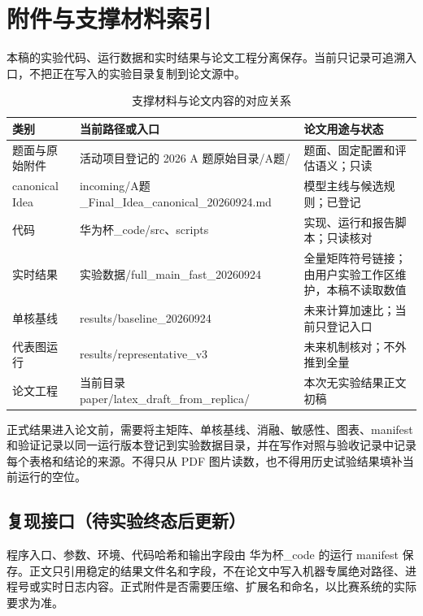\clearpage
\section*{附件与支撑材料索引}
本稿的实验代码、运行数据和实时结果与论文工程分离保存。当前只记录可追溯入口，不把正在写入的实验目录复制到论文源中。
\begin{table}[H]\centering\caption{支撑材料与论文内容的对应关系}
\begin{tabularx}{\linewidth}{lYY}\toprule
类别 & 当前路径或入口 & 论文用途与状态\\\midrule
题面与原始附件 & \textnormal{活动项目登记的 2026 A 题原始目录/A题/} & 题面、固定配置和评估语义；只读\\
canonical Idea & \textnormal{incoming/A题\_Final\_Idea\_canonical\_20260924.md} & 模型主线与候选规则；已登记\\
代码 & \textnormal{华为杯\_code/src、scripts} & 实现、运行和报告脚本；只读核对\\
实时结果 & \textnormal{实验数据/full\_main\_fast\_20260924} & 全量矩阵符号链接；由用户实验工作区维护，本稿不读取数值\\
单核基线 & \textnormal{results/baseline\_20260924} & 未来计算加速比；当前只登记入口\\
代表图运行 & \textnormal{results/representative\_v3} & 未来机制核对；不外推到全量\\
论文工程 & 当前目录 \textnormal{paper/latex\_draft\_from\_replica/} & 本次无实验结果正文初稿\\\bottomrule
\end{tabularx}\end{table}

正式结果进入论文前，需要将主矩阵、单核基线、消融、敏感性、图表、manifest 和验证记录以同一运行版本登记到实验数据目录，并在写作对照与验收记录中记录每个表格和结论的来源。不得只从 PDF 图片读数，也不得用历史试验结果填补当前运行的空位。

\subsection*{复现接口（待实验终态后更新）}
程序入口、参数、环境、代码哈希和输出字段由 \textnormal{华为杯\_code} 的运行 manifest 保存。正文只引用稳定的结果文件名和字段，不在论文中写入机器专属绝对路径、进程号或实时日志内容。正式附件是否需要压缩、扩展名和命名，以比赛系统的实际要求为准。
